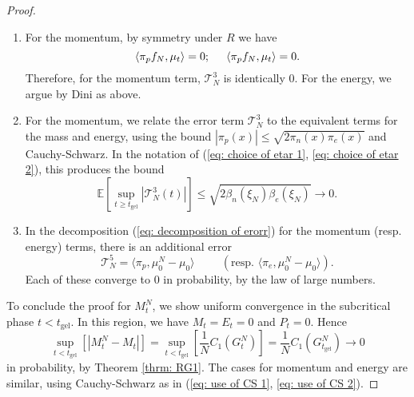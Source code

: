 \begin{proof}
\begin{enumerate}[label=\roman{*}).]
       \item For the momentum, by symmetry under $R$ we have \begin{equation}
           \langle \pi_p f_N, \mu_t\rangle =0; \hspace{0.5cm} \langle \pi_p f_N, \mu_t\rangle =0.
       \end{equation} Therefore, for the momentum term, $\mathcal{T}^3_N$ is identically $0$. For the energy, we argue by Dini as above.
       \item For the momentum, we relate the error term $\mathcal{T}^3_N$ to the equivalent terms for the mass and energy, using the bound $|\pi_p(x)|\le\sqrt{2\pi_n(x)\pi_e(x)}$ and Cauchy-Schwarz. In the notation of (\ref{eq: choice of etar 1}, \ref{eq: choice of etar 2}), this produces the bound \begin{equation}
           \mathbb{E}\left[\sup_{t\geq t_\text{gel}} |\mathcal{T}^3_N(t)|\right] \leq \sqrt{2 \beta_n(\xi_N)\beta_e(\xi_N)} \rightarrow 0.
       \end{equation}
       \item In the decomposition (\ref{eq: decomposition of erorr}) for the momentum (resp. energy) terms, there is an additional error \begin{equation}
           \mathcal{T}^5_N = \langle \pi_p, \mu^N_0-\mu_0\rangle \hspace{1cm}\left(\text{resp. } \langle \pi_e, \mu^N_0-\mu_0\rangle\right).
       \end{equation} Each of these converge to $0$ in probability, by the law of large numbers.
   \end{enumerate} \bigskip  To conclude the proof for $M^N_t$, we show uniform convergence in the subcritical phase $t<t_\text{gel}$. In this region, we have $M_t=E_t=0$ and $P_t=0$. Hence \begin{equation}
       \sup_{t<t_\text{gel}} \left[|M^N_t-M_t|\right] = \sup_{t<t_\text{gel}}\left[ \frac{1}{N}C_1(G^N_t)\right]=\frac{1}{N}C_1(G^N_{t_\text{gel}}) \rightarrow 0
   \end{equation} in probability, by Theorem \ref{thrm: RG1}. The cases for momentum and energy are similar, using Cauchy-Schwarz as in (\ref{eq: use of CS 1}, \ref{eq: use of CS 2}). \end{proof} 
   

